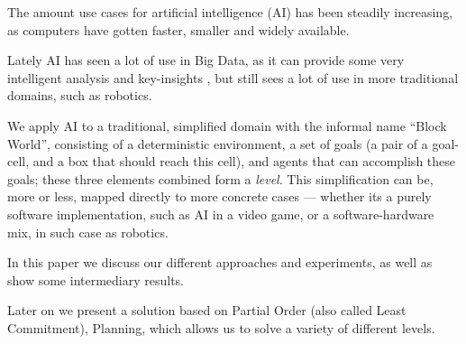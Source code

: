 \documentclass[Main]{subfiles}
\begin{document}
The amount use cases for artificial intelligence (AI) has been steadily increasing, as computers have gotten faster, smaller and widely available.\citep{barrons2013}\citep{poynter2014}\citep{sabhnaniai}

Lately AI has seen a lot of use in Big Data, as it can provide some very intelligent analysis and key-insights \citep{OLeary2013},
but still sees a lot of use in more traditional domains, such as robotics.

We apply AI to a traditional, simplified domain with the informal name ``Block World'', consisting of a deterministic environment, a set of goals (a pair of a goal-cell, and a box that should reach this cell), and agents that can accomplish these goals; these three elements combined form a \textit{level}.
This simplification can be, more or less, mapped directly to more concrete cases --- 
whether its a purely software implementation, such as AI in a video game, or a software-hardware mix, in such case as robotics.

In this paper we discuss our different approaches and experiments, as well as show some intermediary results.

Later on we present a solution based on Partial Order (also called Least Commitment), Planning, 
which allows us to solve a variety of different levels. 
\end{document}

